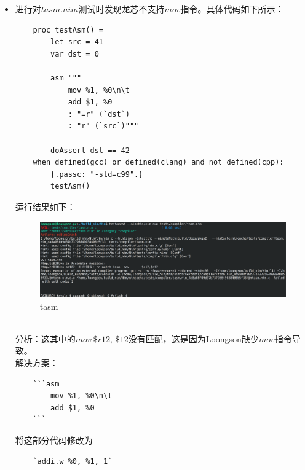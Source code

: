 \documentclass[UTF8]{ctexart}
\begin{document}
		\begin{itemize}[leftmargin=3.5em]
			\item 进行对$ tasm.nim $测试时发现龙芯不支持$ mov $指令。具体代码如下所示：
			\begin{tcolorbox}[colback=gray!20, colframe=gray!20, rounded corners, boxrule=-5pt, height=0.32\textheight, width=0.75\textwidth, left=0pt, right=0pt, top=0pt, bottom=0pt]
				\begin{verbatim}
	proc testAsm() = 
		let src = 41
		var dst = 0
		
		asm """
			mov %1, %0\n\t
			add $1, %0
			: "=r" (`dst`)
			: "r" (`src`)"""
		
		doAssert dst == 42
	when defined(gcc) or defined(clang) and not defined(cpp):
		{.passc: "-std=c99".}
		testAsm()
				\end{verbatim}
			\end{tcolorbox}
			运行结果如下：
			\begin{figure}[htbp]
				\centering
				\includegraphics[width=\linewidth]{tasm_err_snap.png}
				\caption{tasm}
				\label{fig:tasm_err}
			\end{figure} \\
			分析：这其中的$ mov\:\$r12,\,\$12 $没有匹配，这是因为Loongson缺少$ mov $指令导致。 \\
			解决方案：
			\begin{tcolorbox}[colback=gray!20, colframe=gray!20, rounded corners, boxrule=-5pt, height=0.07\textheight, width=0.2\textwidth, left=0pt, right=0pt, top=0pt, bottom=0pt]
				\begin{verbatim}
	```asm
		mov %1, %0\n\t
		add $1, %0
	```
				\end{verbatim}
			\end{tcolorbox}
			将这部分代码修改为
			\begin{tcolorbox}[colback=gray!20, colframe=gray!20, rounded corners, boxrule=-5pt, height=0.01\textheight, width=0.23\textwidth, left=0pt, right=0pt, top=0pt, bottom=0pt]
				\begin{verbatim}
	`addi.w %0, %1, 1`
				\end{verbatim}
			\end{tcolorbox}
		\end{itemize}
\end{document}
